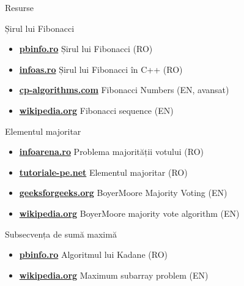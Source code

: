 \documentclass{beamer}
\begin{document}
\begin{frame}{Resurse}
  \begin{block}{Șirul lui Fibonacci}
    \begin{itemize}\footnotesize\itemsep0pt
      \item \href{https://www.pbinfo.ro/articole/5537/sirul-lui-fibonacci}{\textbf{pbinfo.ro}} \textemdash{} Șirul lui Fibonacci (RO)
      \item \href{https://infoas.ro/lectie/105/sirul-lui-fibonacci-in-c}{\textbf{infoas.ro}} \textemdash{} Șirul lui Fibonacci în C++ (RO)
      \item \href{https://cp-algorithms.com/algebra/fibonacci-numbers.html}{\textbf{cp-algorithms.com}} \textemdash{} Fibonacci Numbers (EN, avansat)
      \item \href{https://en.wikipedia.org/wiki/Fibonacci_sequence}{\textbf{wikipedia.org}} \textemdash{} Fibonacci sequence (EN)
    \end{itemize}
  \end{block}
  \vspace{-6pt}
  \begin{block}{Elementul majoritar}
    \begin{itemize}\footnotesize\itemsep0pt
      \item \href{https://infoarena.ro/problema-majoritatii-votului}{\textbf{infoarena.ro}} \textemdash{} Problema majorității votului (RO)
      \item \href{https://tutoriale-pe.net/elementul-majoritar-elmaj/}{\textbf{tutoriale-pe.net}} \textemdash{} Elementul majoritar (RO)
      \item \href{https://www.geeksforgeeks.org/theory-of-computation/boyer-moore-majority-voting-algorithm/}{\textbf{geeksforgeeks.org}} \textemdash{} Boyer\textendash{}Moore Majority Voting (EN)
      \item \href{https://en.wikipedia.org/wiki/Boyer\%E2\%80\%93Moore_majority_vote_algorithm}{\textbf{wikipedia.org}} \textemdash{} Boyer\textendash{}Moore majority vote algorithm (EN)
    \end{itemize}
  \end{block}
  \vspace{-6pt}
  \begin{block}{Subsecvența de sumă maximă}
    \begin{itemize}\footnotesize\itemsep0pt
      \item \href{https://www.pbinfo.ro/articole/32848/algoritmul-lui-kadane}{\textbf{pbinfo.ro}} \textemdash{} Algoritmul lui Kadane (RO)
      \item \href{https://en.wikipedia.org/wiki/Maximum_subarray_problem}{\textbf{wikipedia.org}} \textemdash{} Maximum subarray problem (EN)
    \end{itemize}
  \end{block}
\end{frame}
\end{document}
